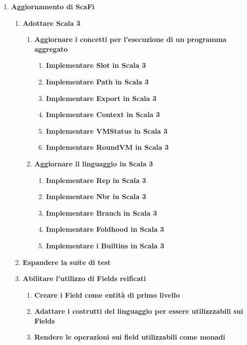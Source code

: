 \documentclass[12pt, a4paper]{article}
\begin{document}
\begin{enumerate}
    \color{cyan}    
    \item \textbf{Aggiornamento di ScaFi}
        \begin{enumerate}
            \item \textbf{Adottare Scala 3}
            \begin{enumerate}
                \item \textbf{Aggiornare i concetti per l'esecuzione di un programma aggregato}
                \begin{enumerate}
                    \item \textbf{Implementare Slot in Scala 3}
                    \item \textbf{Implementare Path in Scala 3}
                    \item \textbf{Implementare Export in Scala 3}
                    \item \textbf{Implementare Context in Scala 3}
                    \item \textbf{Implementare VMStatus in Scala 3}
                    \item \textbf{Implementare RoundVM in Scala 3}
                \end{enumerate}

                \item \textbf{Aggiornare il linguaggio in Scala 3}
                \begin{enumerate}
                    \item \textbf{Implementare Rep in Scala 3}
                    \item \textbf{Implementare Nbr in Scala 3}
                    \item \textbf{Implementare Branch in Scala 3}
                    \item \textbf{Implementare Foldhood in Scala 3}
                    \item \textbf{Implementare i Builtins in Scala 3}
                \end{enumerate}
                
            \end{enumerate}    
            \item \textbf{Espandere la suite di test}
            \item \textbf{Abilitare l'utilizzo di Fields reificati}
            \begin{enumerate}
                \item \textbf{Creare i Field come entità di primo livello} 
                \item \textbf{Adattare i costrutti del linguaggio per essere utilizzzabili sui Fields}
                \item \textbf{Rendere le operazioni sui field utilizzabili come monadi}
            \end{enumerate}
        \end{enumerate}


\end{enumerate}
\end{document}
